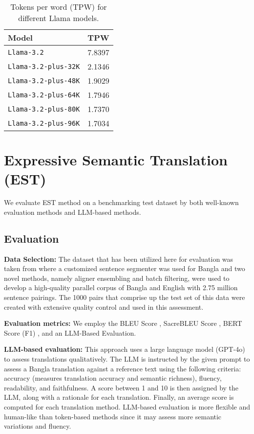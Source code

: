 \begin{table}[h!]
\centering
\begin{tabular}{lc}
\hline
\textbf{Model} & \textbf{TPW} \\
\hline
\verb|Llama-3.2|       & 7.8397 \\
\verb|Llama-3.2-plus-32K|     & 2.1346 \\
\verb|Llama-3.2-plus-48K|     & 1.9029 \\
\verb|Llama-3.2-plus-64K|     & 1.7946 \\
\verb|Llama-3.2-plus-80K|     & 1.7370 \\
\verb|Llama-3.2-plus-96K|     & 1.7034 \\
\hline
\end{tabular}
\caption{Tokens per word (TPW) for different Llama models.}
\label{tab:tokens-per-word}
\end{table}

\section{Expressive Semantic Translation (EST)}
\label{sec:app_est}



We evaluate EST method on a benchmarking test dataset by both well-known evaluation methods and LLM-based methods. 

\subsection{Evaluation}
\noindent  \textbf{Data Selection: } 
The dataset that has been utilized here for evaluation was taken from \cite{hasan2020not} where a customized sentence segmenter was used for Bangla and two novel methods, namely aligner ensembling and batch filtering, were used to develop a high-quality parallel corpus of Bangla and English with 2.75 million sentence pairings. The 1000 pairs that comprise up the test set of this data were created with extensive quality control and used in this assessment.   

\noindent \textbf{Evaluation metrics: } We employ the BLEU Score \cite{papineni2002bleu}, SacreBLEU Score \cite{post2018call}, BERT Score (F1) \cite{zhang2020bertscore}, and an LLM-Based Evaluation.  

\textbf{LLM-based evaluation: } This approach uses a large language model (GPT-4o) to assess translations qualitatively. The LLM is instructed by the given prompt to assess a Bangla translation against a reference text using the following criteria: accuracy (measures translation accuracy and semantic richness), fluency, readability, and faithfulness. A score between 1 and 10 is then assigned by the LLM, along with a rationale for each translation. Finally, an average score is computed for each translation method. LLM-based evaluation is more flexible and human-like than token-based methods since it may assess more semantic variations and fluency.

